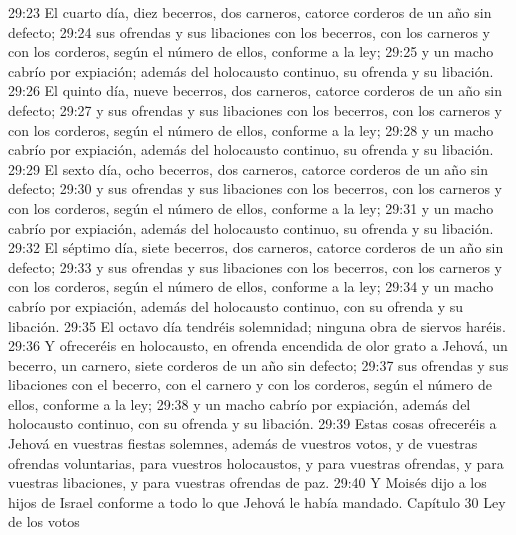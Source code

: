 29:23 El cuarto día, diez becerros, dos carneros, catorce corderos de un año sin defecto;  
29:24 sus ofrendas y sus libaciones con los becerros, con los carneros y con los corderos, según el número de ellos, conforme a la ley;  
29:25 y un macho cabrío por expiación; además del holocausto continuo, su ofrenda y su libación.  
29:26 El quinto día, nueve becerros, dos carneros, catorce corderos de un año sin defecto;  
29:27 y sus ofrendas y sus libaciones con los becerros, con los carneros y con los corderos, según el número de ellos, conforme a la ley;  
29:28 y un macho cabrío por expiación, además del holocausto continuo, su ofrenda y su libación.  
29:29 El sexto día, ocho becerros, dos carneros, catorce corderos de un año sin defecto;  
29:30 y sus ofrendas y sus libaciones con los becerros, con los carneros y con los corderos, según el número de ellos, conforme a la ley;  
29:31 y un macho cabrío por expiación, además del holocausto continuo, su ofrenda y su libación.  
29:32 El séptimo día, siete becerros, dos carneros, catorce corderos de un año sin defecto;  
29:33 y sus ofrendas y sus libaciones con los becerros, con los carneros y con los corderos, según el número de ellos, conforme a la ley;  
29:34 y un macho cabrío por expiación, además del holocausto continuo, con su ofrenda y su libación.  
29:35 El octavo día tendréis solemnidad; ninguna obra de siervos haréis.  
29:36 Y ofreceréis en holocausto, en ofrenda encendida de olor grato a Jehová, un becerro, un carnero, siete corderos de un año sin defecto;  
29:37 sus ofrendas y sus libaciones con el becerro, con el carnero y con los corderos, según el número de ellos, conforme a la ley;  
29:38 y un macho cabrío por expiación, además del holocausto continuo, con su ofrenda y su libación.  
29:39 Estas cosas ofreceréis a Jehová en vuestras fiestas solemnes, además de vuestros votos, y de vuestras ofrendas voluntarias, para vuestros holocaustos, y para vuestras ofrendas, y para vuestras libaciones, y para vuestras ofrendas de paz.  
29:40 Y Moisés dijo a los hijos de Israel conforme a todo lo que Jehová le había mandado.  
Capítulo 30 
Ley de los votos  

